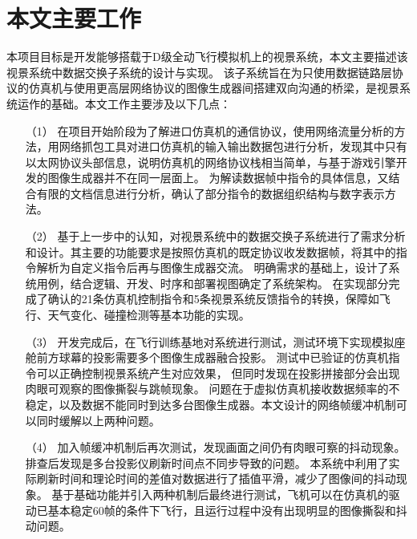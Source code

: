 \section{本文主要工作}
本项目目标是开发能够搭载于D级全动飞行模拟机上的视景系统，本文主要描述该视景系统中数据交换子系统的设计与实现。
该子系统旨在为只使用数据链路层协议的仿真机与使用更高层网络协议的图像生成器间搭建双向沟通的桥梁，是视景系统运作的基础。本文工作主要涉及以下几点：
\begin{itemize}  
    \item [（1）]
    在项目开始阶段为了解进口仿真机的通信协议，使用网络流量分析的方法，用网络抓包工具对进口仿真机的输入输出数据包进行分析，发现其中只有以太网协议头部信息，说明仿真机的网络协议栈相当简单，与基于游戏引擎开发的图像生成器并不在同一层面上。
    为解读数据帧中指令的具体信息，又结合有限的文档信息进行分析，确认了部分指令的数据组织结构与数字表示方法。
    \item [（2）]
    基于上一步中的认知，对视景系统中的数据交换子系统进行了需求分析和设计。其主要的功能要求是按照仿真机的既定协议收发数据帧，将其中的指令解析为自定义指令后再与图像生成器交流。
    明确需求的基础上，设计了系统用例，结合逻辑、开发、时序和部署视图确定了系统架构。
    在实现部分完成了确认的21条仿真机控制指令和5条视景系统反馈指令的转换，保障如飞行、天气变化、碰撞检测等基本功能的实现。
    \item [（3）]
    开发完成后，在飞行训练基地对系统进行测试，测试环境下实现模拟座舱前方球幕的投影需要多个图像生成器融合投影。
    测试中已验证的仿真机指令可以正确控制视景系统产生对应效果，
    但同时发现在投影拼接部分会出现肉眼可观察的图像撕裂与跳帧现象。
    问题在于虚拟仿真机接收数据频率的不稳定，以及数据不能同时到达多台图像生成器。本文设计的网络帧缓冲机制可以同时缓解以上两种问题。
    \item [（4）]
    加入帧缓冲机制后再次测试，发现画面之间仍有肉眼可察的抖动现象。排查后发现是多台投影仪刷新时间点不同步导致的问题。
    本系统中利用了实际刷新时间和理论时间的差值对数据进行了插值平滑，减少了图像间的抖动现象。
    基于基础功能并引入两种机制后最终进行测试，飞机可以在仿真机的驱动已基本稳定60帧的条件下飞行，且运行过程中没有出现明显的图像撕裂和抖动问题。
\end{itemize}

